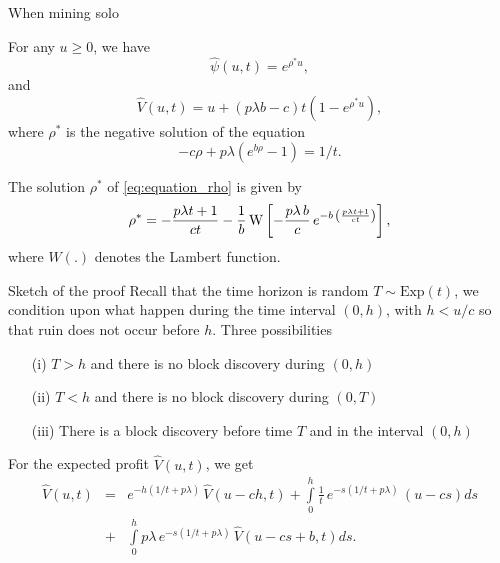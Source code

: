 \documentclass{beamer}
\begin{document}
\begin{frame}{When mining solo}
\scriptsize
\begin{tcolorbox}[enhanced,drop shadow, title=Theorem (profit and ruin when mining solo)]
For any $u\geq0$, we have
\begin{equation*}
\widehat{\psi}(u,t) = e^{\rho^\ast u},
\end{equation*}
and 
\begin{equation*}
\widehat{V}(u,t) = u+(p\lambda b-c)t\left(1-e^{\rho^\ast u }\right),
\end{equation*}
where $\rho^\ast$ is the negative solution of the equation
\begin{equation}\label{eq:equation_rho}
-c\rho + p\lambda(e^{b\rho}-1) = 1/t.
\end{equation}
\end{tcolorbox}
\begin{tcolorbox}[enhanced,drop shadow, title=Lambert function]
The solution $\rho^\ast$ of \eqref{eq:equation_rho} is given by 
\begin{equation*}
  \rho^{\ast}=-\frac{p \lambda t+1}{ct}
  -\frac{1}{b} \,{\rm W} \left[-\frac{p\lambda
    \,b}{c}\,{e^{-b\,\left(\frac{p \lambda t+1}{ct}\right)}}
  \right],
  \end{equation*}
  where $W(.)$ denotes the Lambert function.
\end{tcolorbox}
\end{frame}
\begin{frame}[allowframebreaks]{Sketch of the proof}
\scriptsize
Recall that the time horizon is random $T\sim\text{Exp}(t)$, we condition upon what happen during the time interval $(0,h)$, with $h<u/c$ so that ruin does not occur before $h$. Three possibilities
\begin{itemize}
  \item[(i)] $T>h$ and there is no block discovery during $(0,h)$
  \item[(ii)] $T<h$ and there is no block discovery during $(0,T)$
  \item[(iii)] There is a block discovery before time $T$ and in the interval $(0,h)$
\end{itemize}
For the expected profit $\widehat{V}(u,t)$, we get 
\begin{eqnarray*}
  \widehat{V}(u,t)& =&e^{-h(1/t + p\lambda)}\,\widehat{V}(u-ch,t)+\int\limits_0^h\frac1t\, e^{-s(1/t + p\lambda)}\,(u-cs)ds\\
  &+&\int\limits_0^h p\lambda\, e^{-s(1/t + p\lambda)}\,\widehat{V}(u-cs+b,t)ds.
  \end{eqnarray*}
  \end{frame}
\end{document}
